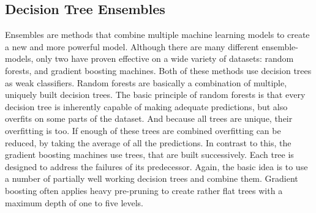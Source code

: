 \subsection{Decision Tree Ensembles}
Ensembles are methods that combine multiple machine learning models to create a new and more powerful model. Although there are many different ensemble-models, only two have proven effective on a wide variety of datasets: random forests, and gradient boosting machines. Both of these methods use decision trees as weak classifiers. Random forests are basically a combination of multiple, uniquely built decision trees. The basic principle of random forests is that every decision tree is inherently capable of making adequate predictions, but also overfits on some parts of the dataset. And because all trees are unique, their overfitting is too. If enough of these trees are combined overfitting can be reduced, by taking the average of all the predictions. In contrast to this, the gradient boosting machines use trees, that are built successively. Each tree is designed to address the failures of its predecessor. Again, the basic idea is to use a number of partially well working decision trees and combine them. Gradient boosting often applies heavy pre-pruning to create rather flat trees with a maximum depth of one to five levels. 
 
%
